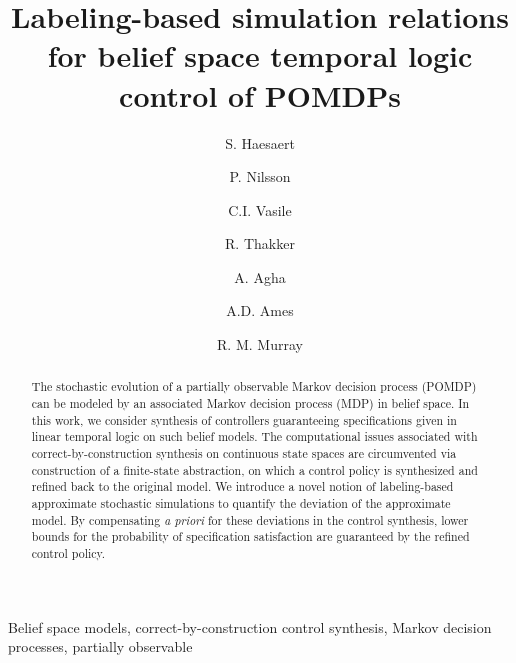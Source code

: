\documentclass{ifacconf}
\begin{document}
\begin{frontmatter}

\title{Labeling-based simulation relations for belief space temporal logic control of POMDPs}

\author[cal]{S. Haesaert}
\author[cal]{P. Nilsson}
\author[mit]{C.I. Vasile}
\author[jpl]{R. Thakker}
\author[jpl]{A. Agha}
\author[cal]{A.D.  Ames}
\author[cal]{R. M. Murray}



\address[cal]{California Institute of Technology,
   Pasadena, CA 91125 USA} %
\address[mit]{Massachusetts Institute of Technology,
   Cambridge, MA 02139 USA}%
\address[jpl]{Jet Propulsion Laboratory,
   Pasadena, CA 91109 USA}%
\maketitle
\begin{abstract}
The stochastic evolution of a partially observable Markov decision process (POMDP) can be modeled by an associated Markov decision process (MDP) in belief space.
In this work, we consider synthesis of controllers guaranteeing  specifications given in linear temporal logic on such belief models. The computational issues associated with correct-by-construction synthesis on continuous state spaces are circumvented via construction of a finite-state abstraction, on which a control policy is synthesized and refined back to the original model. We introduce a novel notion of labeling-based approximate stochastic simulations to quantify the deviation of the approximate model. By compensating {\it a priori} for these deviations in the control synthesis, lower bounds for the probability of specification satisfaction are guaranteed by the refined control policy.
\end{abstract}
\begin{keyword} Belief space models,
correct-by-construction control synthesis, Markov decision processes, partially observable
\end{keyword}

\end{frontmatter}
\end{document}
